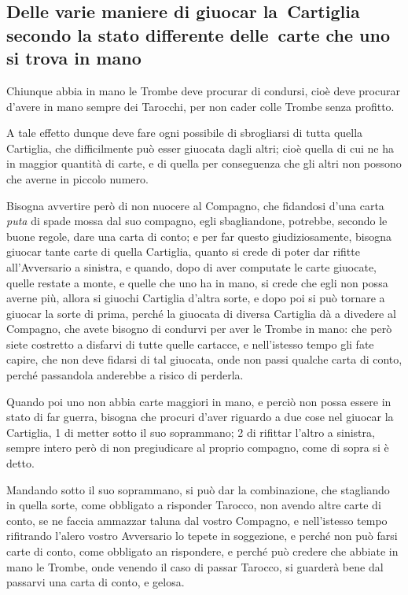 \documentclass[11pt,a6paper]{article}
\begin{document}
\subsection*{Delle varie maniere di giuocar la~Cartiglia secondo la stato differente delle~carte
che uno si trova in mano}

Chiunque abbia in mano le Trombe deve procurar di condursi, cioè deve procurar d'avere in mano sempre dei Tarocchi, per non cader colle Trombe senza profitto.

A tale effetto dunque deve fare ogni possibile di sbrogliarsi di tutta quella Cartiglia, che difficilmente può esser giuocata dagli altri; cioè quella di cui ne ha in maggior quantità di carte, e di quella per conseguenza che gli altri non possono che averne in piccolo numero.

Bisogna avvertire però di non nuocere al Compagno, che fidandosi d'una carta \textit{puta} di spade mossa dal suo compagno, egli sbagliandone, potrebbe, secondo le buone regole, dare una carta di conto; e
per far questo giudiziosamente, bisogna giuocar tante carte di quella Cartiglia, quanto si crede di poter dar rifitte all'Avversario a sinistra, e quando, dopo di aver computate le carte giuocate, quelle restate a monte, e quelle che uno ha in mano, si crede che egli non possa averne più, allora si giuochi Cartiglia d'altra sorte, e dopo poi si può tornare a giuocar la sorte di prima, perché la giuocata di diversa Cartiglia dà a divedere al Compagno, che avete bisogno di condurvi per aver le Trombe in mano: che però siete costretto a disfarvi di tutte quelle cartacce, e nell'istesso tempo gli fate capire, che non deve fidarsi di tal giuocata, onde non passi qualche carta di conto, perché passandola anderebbe a risico di perderla.

Quando poi uno non abbia carte maggiori in mano, e perciò non possa essere in stato di far guerra, bisogna che procuri d'aver riguardo a due cose nel giuocar la Cartiglia, 1 di metter sotto il suo soprammano; 2 di rifittar l'altro a sinistra, sempre intero però di non pregiudicare al proprio compagno, come di sopra si è detto.

Mandando sotto il suo soprammano, si può dar la combinazione, che stagliando in quella sorte, come obbligato a risponder Tarocco, non avendo altre carte di conto, se ne faccia ammazzar taluna dal vostro Compagno, e nell'istesso tempo rifitrando l'alero vostro Avversario lo tepete in soggezione, e perché non può farsi carte di conto, come obbligato an rispondere, e perché può credere che abbiate in mano le Trombe, onde venendo il caso di passar Tarocco, si guarderà bene dal passarvi una carta di conto, e gelosa.
\end{document}
